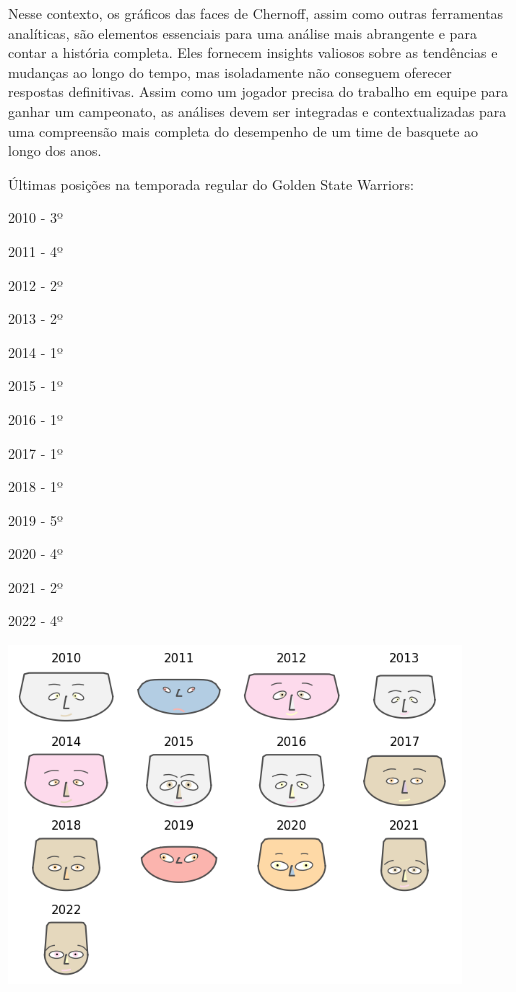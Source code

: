 \documentclass[
]{book}
\begin{document}
Nesse contexto, os gráficos das faces de Chernoff, assim como outras ferramentas analíticas, são elementos essenciais para uma análise mais abrangente e para contar a história completa. Eles fornecem insights valiosos sobre as tendências e mudanças ao longo do tempo, mas isoladamente não conseguem oferecer respostas definitivas. Assim como um jogador precisa do trabalho em equipe para ganhar um campeonato, as análises devem ser integradas e contextualizadas para uma compreensão mais completa do desempenho de um time de basquete ao longo dos anos.

Últimas posições na temporada regular do Golden State Warriors:

2010 - 3º

2011 - 4º

2012 - 2º

2013 - 2º

2014 - 1º

2015 - 1º

2016 - 1º

2017 - 1º

2018 - 1º

2019 - 5º

2020 - 4º

2021 - 2º

2022 - 4º

\includegraphics[width=0.9\textwidth,height=\textheight]{imagens/23.png}

  
\end{document}
